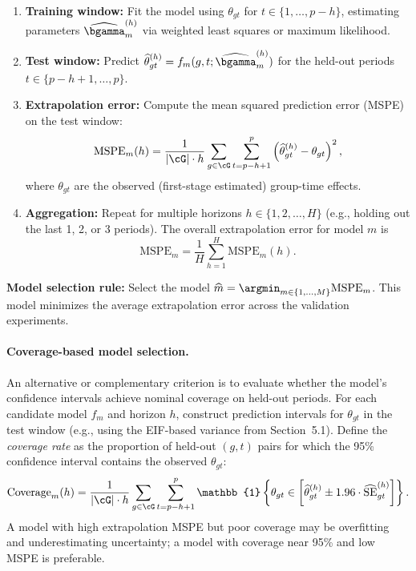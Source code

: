 \documentclass{article}
\begin{document}
\begin{enumerate}
    \item \textbf{Training window:} Fit the model using $\theta_{gt}$ for $t \in \{1, \ldots, p - h\}$, estimating parameters $\widehat{\bgamma}_m^{(h)}$ via weighted least squares or maximum likelihood.
    \item \textbf{Test window:} Predict $\widehat{\theta}_{gt}^{(h)} = f_m(g, t; \widehat{\bgamma}_m^{(h)})$ for the held-out periods $t \in \{p - h + 1, \ldots, p\}$.
    \item \textbf{Extrapolation error:} Compute the mean squared prediction error (MSPE) on the test window:
    \[
    \text{MSPE}_m(h) = \frac{1}{|\cG| \cdot h} \sum_{g \in \cG} \sum_{t = p-h+1}^{p} \left( \widehat{\theta}_{gt}^{(h)} - \theta_{gt} \right)^2,
    \]
    where $\theta_{gt}$ are the observed (first-stage estimated) group-time effects.
    \item \textbf{Aggregation:} Repeat for multiple horizons $h \in \{1, 2, \ldots, H\}$ (e.g., holding out the last 1, 2, or 3 periods). The overall extrapolation error for model $m$ is
    \[
    \text{MSPE}_m = \frac{1}{H} \sum_{h=1}^H \text{MSPE}_m(h).
    \]
\end{enumerate}

\textbf{Model selection rule:} Select the model $\widehat{m} = \argmin_{m \in \{1,\ldots,M\}} \text{MSPE}_m$. This model minimizes the average extrapolation error across the validation experiments.

\paragraph{Coverage-based model selection.}
An alternative or complementary criterion is to evaluate whether the model's confidence intervals achieve nominal coverage on held-out periods. For each candidate model $f_m$ and horizon $h$, construct prediction intervals for $\theta_{gt}$ in the test window (e.g., using the EIF-based variance from Section~5.1). Define the \emph{coverage rate} as the proportion of held-out $(g,t)$ pairs for which the 95\% confidence interval contains the observed $\theta_{gt}$:
\[
\text{Coverage}_m(h) = \frac{1}{|\cG| \cdot h} \sum_{g \in \cG} \sum_{t = p-h+1}^{p} \mathbb{1}\left\{ \theta_{gt} \in \left[\widehat{\theta}_{gt}^{(h)} \pm 1.96 \cdot \widehat{\text{SE}}_{gt}^{(h)} \right] \right\}.
\]
A model with high extrapolation MSPE but poor coverage may be overfitting and underestimating uncertainty; a model with coverage near 95\% and low MSPE is preferable.
\end{document}
